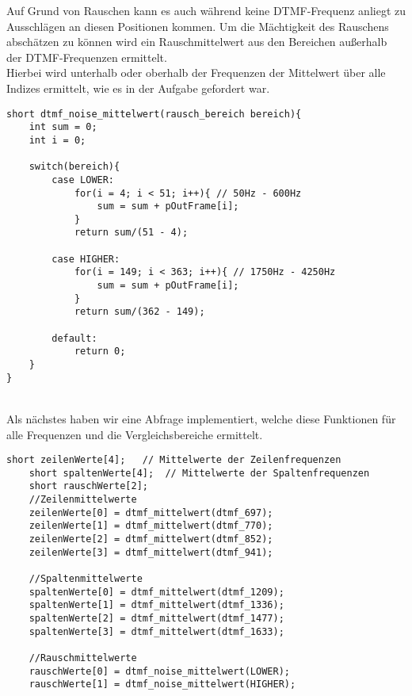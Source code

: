 Auf Grund von Rauschen kann es auch während keine DTMF-Frequenz anliegt zu Ausschlägen an diesen Positionen kommen. Um die Mächtigkeit des Rauschens abschätzen zu können wird ein Rauschmittelwert aus den Bereichen außerhalb der DTMF-Frequenzen ermittelt.\\
Hierbei wird unterhalb oder oberhalb der Frequenzen der Mittelwert über alle Indizes ermittelt, wie es in der Aufgabe gefordert war.\\
 \begin{adjustbox}{width=\textwidth, keepaspectratio} 
  \label{code:procdataKompFIR}
  \begin{lstlisting}[title=Bestimmung Rauschmittelwert]
short dtmf_noise_mittelwert(rausch_bereich bereich){
	int sum = 0;
	int i = 0;
	
	switch(bereich){
		case LOWER:
			for(i = 4; i < 51; i++){ // 50Hz - 600Hz
				sum = sum + pOutFrame[i];
			}
			return sum/(51 - 4);
		
		case HIGHER:
			for(i = 149; i < 363; i++){ // 1750Hz - 4250Hz
				sum = sum + pOutFrame[i];
			}
			return sum/(362 - 149);

		default:
			return 0;	
	}
}
\end{lstlisting}
\end{adjustbox}\\
Als nächstes haben wir eine Abfrage implementiert, welche diese Funktionen für alle Frequenzen und die Vergleichsbereiche ermittelt.\\

  \label{code:procdataKompFIR}
  \begin{lstlisting}[title=Ermittlung der einzelnen Mittelwerte]
short zeilenWerte[4]; 	// Mittelwerte der Zeilenfrequenzen
	short spaltenWerte[4]; 	// Mittelwerte der Spaltenfrequenzen
	short rauschWerte[2];
	//Zeilenmittelwerte
	zeilenWerte[0] = dtmf_mittelwert(dtmf_697);
	zeilenWerte[1] = dtmf_mittelwert(dtmf_770);
	zeilenWerte[2] = dtmf_mittelwert(dtmf_852);
	zeilenWerte[3] = dtmf_mittelwert(dtmf_941);
	
	//Spaltenmittelwerte
	spaltenWerte[0] = dtmf_mittelwert(dtmf_1209);
	spaltenWerte[1] = dtmf_mittelwert(dtmf_1336);
	spaltenWerte[2] = dtmf_mittelwert(dtmf_1477);
	spaltenWerte[3] = dtmf_mittelwert(dtmf_1633);
	
	//Rauschmittelwerte
	rauschWerte[0] = dtmf_noise_mittelwert(LOWER);
	rauschWerte[1] = dtmf_noise_mittelwert(HIGHER);
\end{lstlisting}

